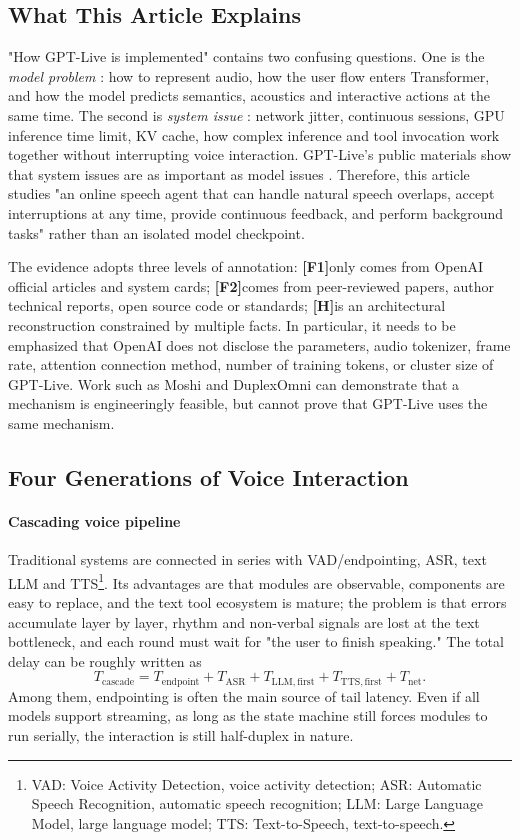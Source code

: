 \documentclass[UTF8,fontset=none,a4paper,10pt]{ctexart}
\newcommand{\FOne}{\textcolor{official}{\textbf{[F1]}}}
\newcommand{\FTwo}{\textcolor{public}{\textbf{[F2]}}}
\newcommand{\Hyp}{\textcolor{hypothesis}{\textbf{[H]}}}
\begin{document}
\subsection{What This Article Explains}

"How GPT-Live is implemented" contains two confusing questions. One is the \emph{ model problem }: how to represent audio, how the user flow enters Transformer, and how the model predicts semantics, acoustics and interactive actions at the same time. The second is \emph{ system issue }: network jitter, continuous sessions, GPU inference time limit, KV cache, how complex inference and tool invocation work together without interrupting voice interaction. GPT-Live's public materials show that system issues are as important as model issues \cite{openai2026gptlive,openai2026continuous}. Therefore, this article studies "an online speech agent that can handle natural speech overlaps, accept interruptions at any time, provide continuous feedback, and perform background tasks" rather than an isolated model checkpoint.

The evidence adopts three levels of annotation: \FOne only comes from OpenAI official articles and system cards; \FTwo comes from peer-reviewed papers, author technical reports, open source code or standards; \Hyp is an architectural reconstruction constrained by multiple facts. In particular, it needs to be emphasized that OpenAI does not disclose the parameters, audio tokenizer, frame rate, attention connection method, number of training tokens, or cluster size of GPT-Live. Work such as Moshi and DuplexOmni can demonstrate that a mechanism is engineeringly feasible, but cannot prove that GPT-Live uses the same mechanism.

\subsection{Four Generations of Voice Interaction}

\paragraph{Cascading voice pipeline}
Traditional systems are connected in series with VAD/endpointing, ASR, text LLM and TTS\footnote{VAD: Voice Activity Detection, voice activity detection; ASR: Automatic Speech Recognition, automatic speech recognition; LLM: Large Language Model, large language model; TTS: Text-to-Speech, text-to-speech. }. Its advantages are that modules are observable, components are easy to replace, and the text tool ecosystem is mature; the problem is that errors accumulate layer by layer, rhythm and non-verbal signals are lost at the text bottleneck, and each round must wait for "the user to finish speaking." The total delay can be roughly written as
\begin{equation}
T_{\mathrm{cascade}}=T_{\mathrm{endpoint}}+T_{\mathrm{ASR}}+T_{\mathrm{LLM,first}}+T_{\mathrm{TTS,first}}+T_{\mathrm{net}}.
\end{equation}
Among them, endpointing is often the main source of tail latency. Even if all models support streaming, as long as the state machine still forces modules to run serially, the interaction is still half-duplex in nature.
\end{document}
